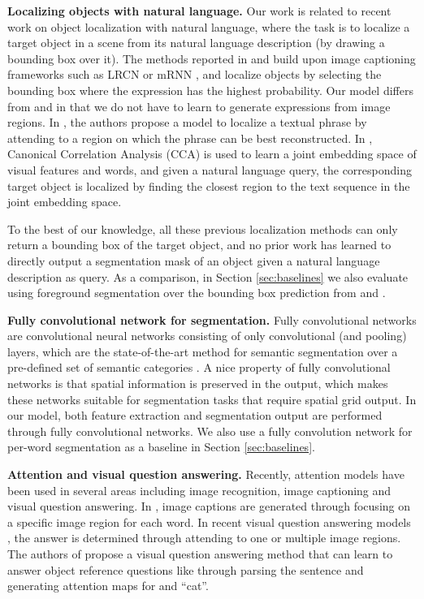 \documentclass[runningheads]{llncs}
\begin{document}
\textbf{Localizing objects with natural language.}
Our work is related to recent work on object localization with natural language, where the task is to localize a target object in a scene from its natural language description (by drawing a bounding box over it). The methods reported in \cite{hu2015natural} and \cite{mao2015generation} build upon image captioning frameworks such as LRCN \cite{donahue2015long} or mRNN \cite{mao2014explain}, and localize objects by selecting the bounding box where the expression has the highest probability. Our model differs from \cite{hu2015natural} and \cite{mao2015generation} in that we do not have to learn to generate expressions from image regions. In \cite{rohrbach2015grounding}, the authors propose a model to localize a textual phrase by attending to a region on which the phrase can be best reconstructed. In \cite{plummer15iccv}, Canonical Correlation Analysis (CCA) is used to learn a joint embedding space of visual features and words, and given a natural language query, the corresponding target object is localized by finding the closest region to the text sequence in the joint embedding space. 

To the best of our knowledge, all these previous localization methods can only return a bounding box of the target object, and no prior work has learned to directly output a segmentation mask of an object given a natural language description as query. As a comparison, in Section \ref{sec:baselines} we also evaluate using foreground segmentation over the bounding box prediction from \cite{hu2015natural} and \cite{rohrbach2015grounding}.

\textbf{Fully convolutional network for segmentation.} Fully convolutional networks are convolutional neural networks consisting of only convolutional (and pooling) layers, which are the state-of-the-art method for semantic segmentation over a pre-defined set of semantic categories \cite{long2015fully,chen2014semantic,zheng2015conditional,yu2015multi}. A nice property of fully convolutional networks is that spatial information is preserved in the output, which makes these networks suitable for segmentation tasks that require spatial grid output. In our model, both feature extraction and segmentation output are performed through fully convolutional networks. We also use a fully convolution network for per-word segmentation as a baseline in Section \ref{sec:baselines}.

\textbf{Attention and visual question answering.} Recently, attention models have been used in several areas including image recognition, image captioning and visual question answering. In \cite{xu2015show}, image captions are generated through focusing on a specific image region for each word. In recent visual question answering models \cite{yang2015stacked,xu2015ask}, the answer is determined through attending to one or multiple image regions. The authors of \cite{andreas2016learning} propose a visual question answering method that can learn to answer object reference questions like  through parsing the sentence and generating attention maps for  and ``cat''.
\end{document}
